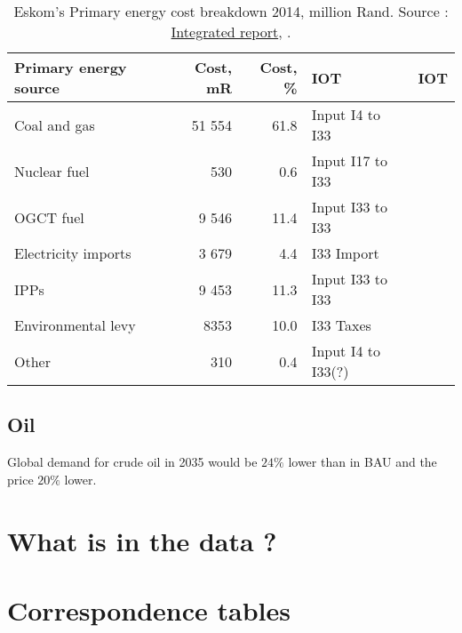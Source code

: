 \documentclass[12pt,english]{article}
\begin{document}
\begin{table}[ht]
	\centering
	\begin{tabular}{lrrlr}
		\toprule
		Primary energy source	& Cost, mR  & Cost, \% & IOT  & IOT\\ 
		\midrule
		Coal and gas & 51 554   &  61.8   & Input I4 to I33 &\\
		Nuclear  fuel &  530  &   0.6  & Input I17 to I33& \\
		OGCT fuel & 9 546   &   11.4   & Input I33 to I33  & \\
		Electricity  imports & 3 679   &  4.4  & I33 Import & \\
		IPPs &  9 453  &  11.3  & Input I33 to I33 & \\
		Environmental levy & 8353 &   10.0   & I33 Taxes & \\
		Other &  310  &  0.4  & Input I4 to I33(?) 	& \\
		\bottomrule
	\end{tabular}
	\caption{\label{EskomPrimaryEnergy}Eskom's Primary energy cost breakdown 2014, million Rand. Source : \href{http://www.eskom.co.za/IR2015/Documents/EskomIR2015single.pdf}{Integrated report}, \citep{Eskom2014AR}.}
\end{table}




\subsection{Oil}

Global demand for crude oil in 2035 would be $24\%$ lower than in BAU and the price $20\%$ lower. 




\clearpage

\newpage


\clearpage

\appendix

\section{What is in the data ?}

\section{Correspondence tables}
\end{document}
